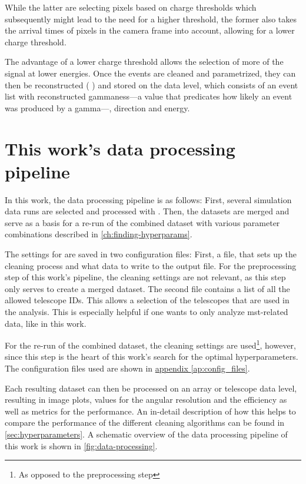 While the latter are selecting pixels based on charge thresholds which
subsequently might lead to the need for a higher threshold, the former also takes the arrival times of
pixels in the camera frame into account, allowing for a lower charge threshold.

The advantage of a lower charge threshold allows the selection of more of the signal at lower energies.
Once the events are cleaned and parametrized, they can then be reconstructed (\dlob{} \rightarrow \dlt{})
and stored on the \dlt{} data level, which consists of an event list with reconstructed gammaness---a value
that predicates how likely an event was produced by a gamma---, direction and energy.


\section{This work's data processing pipeline}
\label{sec:pipeline}
In this work, the data processing pipeline is as follows: First, several simulation data runs are
selected and processed with \ctapipe{}. Then, the datasets are merged and serve as a basis for a re-run
of the combined dataset with various parameter combinations described in \autoref{ch:finding-hyperparams}.

The settings for \ctapipe{} are saved in two configuration files: First, a file, that sets up the
cleaning process and what data to write to the output file. For the preprocessing step of this work's
pipeline, the cleaning settings are not relevant, as this step only serves to create a merged dataset.
The second file contains a list of all the allowed telescope IDs. This allows a selection of the telescopes
that are used in the analysis. This is especially helpful if one wants to only analyze \gls{mst}-related
data, like in this work.

For the re-run of the combined dataset, the cleaning settings are used\footnote{As opposed to the preprocessing step},
however, since this step is the heart of this work's search for the optimal hyperparameters.
The configuration files used are shown in \hyperref[ap:config_files]{appendix \ref{ap:config_files}}.

Each resulting dataset can then be processed on an array or telescope data level, resulting in
\dloa{} image plots, values for the angular resolution and the efficiency as well as metrics for the
performance. An in-detail description of how this helps to compare the performance of the different
cleaning algorithms can be found in \autoref{sec:hyperparameters}. A schematic overview of the data
processing pipeline of this work is shown in \autoref{fig:data-processing}.

